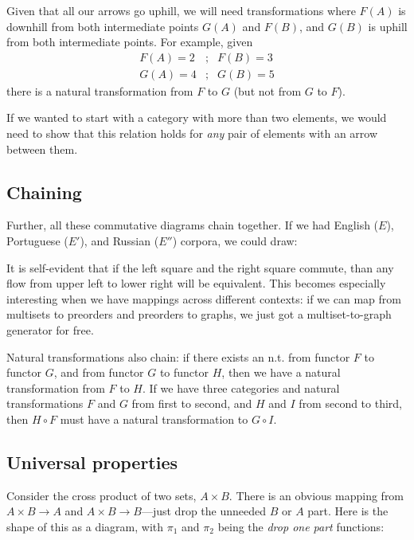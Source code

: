 \documentclass[11pt]{article}
\begin{document}
Given that all our arrows go uphill, we will need transformations where $F(A)$ is downhill
from both intermediate points $G(A)$ and $F(B)$, and $G(B)$ is uphill from both
intermediate points. For example, given
\begin{eqnarray*}
    F(A) = 2 &;& F(B) = 3\\
    G(A) = 4 &;& G(B) = 5
\end{eqnarray*} 
there is a natural transformation from $F$ to $G$ (but not from $G$ to $F$).

If we wanted to start with a category with more than two elements, we would need to show
that this relation holds for {\em any} pair of elements with an arrow between them.

\subsection{Chaining}
Further, all these commutative diagrams chain together. If we had English ($E$), Portuguese ($E'$), and
Russian  ($E''$) corpora, we could draw:


It is self-evident that if the left square and the right square commute, than any flow
from upper left to lower right will be equivalent. This becomes especially interesting
when we have mappings across different contexts: if we can map from multisets to preorders
and preorders to graphs, we just got a multiset-to-graph generator for free.

Natural transformations also chain: if there exists an n.t. from functor $F$ to functor
$G$, and from functor $G$ to functor $H$, then we have a natural transformation from $F$
to $H$. If we have three categories and natural transformations $F$ and $G$ from first to
second, and $H$ and $I$ from second to third, then $H\circ F$ must have a natural
transformation to $G\circ I$.

\subsection{Universal properties}
Consider the cross product of two sets, $A\times B$. There is an obvious mapping from
$A\times B \to A$ and $A\times B \to B$---just drop the unneeded $B$ or $A$ part. Here
is the shape of this as a diagram, with $\pi_1$ and $\pi_2$ being the {\em drop one
part} functions:
\end{document}
